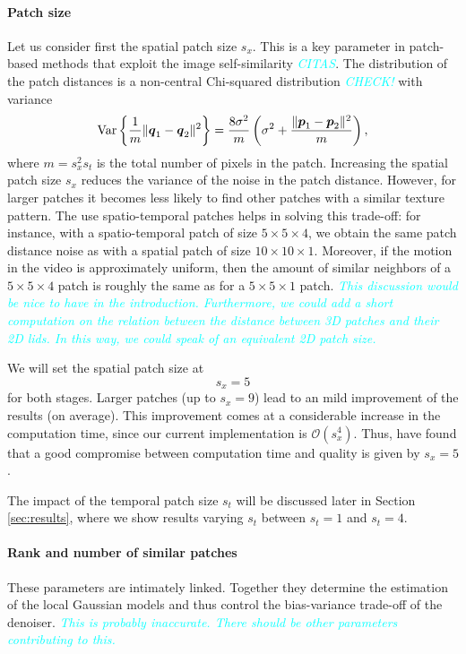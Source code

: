 \documentclass[10pt, journal, twocolumn, final, a4paper]{IEEEtran}
\newcommand{\pa}[1]{\textcolor{cyan}{#1}}
\newcommand{\pcomment}[1]{\textit{\pa{#1}}}
\newcommand{\ma}[1]{\boldsymbol{#1}}
\begin{document}
\paragraph{Patch size} Let us consider first the spatial patch
size $s_x$. This is a key parameter in patch-based methods that
exploit the image self-similarity \pcomment{CITAS}. The distribution of the 
patch distances is a non-central Chi-squared distribution \cite{Dabov2007tip}
\pcomment{CHECK!}
with variance 
\[\textnormal{Var}\left\{\frac1{m}\|\ma q_1 - \ma q_2\|^2\right\} = \frac{8\sigma^2}{m}\left(\sigma^2 + \frac{\|\ma p_1 - \ma p_2\|^2}{m}\right),\]
where $m = s_x^2s_t$ is the total number of pixels in the patch.
Increasing the spatial patch size $s_x$ reduces the variance of the noise in the patch
distance. 
However, for larger
patches it becomes less likely to find other patches with a similar texture
pattern. The use spatio-temporal patches helps in solving this trade-off: for
instance, with a spatio-temporal patch of size $5\times 5\times 4$, we obtain
the same patch distance noise as with a spatial patch of size $10\times 10
\times 1$. Moreover, if the motion in the video is approximately uniform, then the 
amount of similar neighbors of a $5\times 5\times 4$ patch is roughly the same
as for a $5\times 5\times 1$ patch.
\pcomment{This discussion would be nice to have in the introduction. Furthermore,
we could add a short computation on the relation between the distance between
3D patches and their 2D lids. In this way, we could speak of an equivalent 
2D patch size.}

We will set the spatial patch size at \[s_x = 5\] for both stages. Larger
patches (up to $s_x = 9$) lead to an mild improvement of the results (on
average). This improvement comes at a considerable increase in the
computation time, since our current implementation is $\mathcal O(s_x^4)$. Thus,
have found that a good compromise between computation time and quality is given
by $s_x = 5$.

The impact of the temporal patch size $s_t$ will be discussed later in Section
\ref{sec:results}, where we show results varying $s_t$ between $s_t = 1$ and $s_t = 4$.

\paragraph{Rank and number of similar patches} These parameters are intimately
linked. Together they determine the estimation of the local Gaussian models
and thus control the bias-variance trade-off of the denoiser.
\pcomment{This is probably inaccurate. There should be other parameters
contributing to this.}
\end{document}

